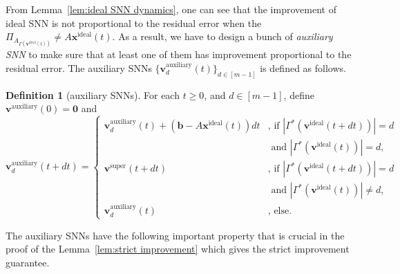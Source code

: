 \documentclass[11pt]{article}
\theoremstyle{remark}
\theoremstyle{definition}
\newtheorem{definition}{Definition}
\newcommand{\bx}{\mathbf{x}}
\newcommand{\bb}{\mathbf{b}}
\newcommand{\bv}{\mathbf{v}}
\begin{document}
From Lemma~\ref{lem:ideal SNN dynamics}, one can see that the improvement of ideal SNN is not proportional to the residual error when the $\Pi_{A_{\Gamma(\bv^\text{ideal}(t))}}\neq A\bx^\text{ideal}(t)$. As a result, we have to design a bunch of \textit{auxiliary SNN} to make sure that at least one of them has improvement proportional to the residual error. The auxiliary SNNs $\{\bv^\text{auxiliary}_d(t)\}_{d\in[m-1]}$ is defined as follows.
\begin{definition}[auxiliary SNNs]\label{def:auxiliary}
	For each $t\geq0$, and $d\in[m-1]$, define $\bv^\text{auxiliary}(0)=\mathbf{0}$ and
	\[
	\bv^\text{auxiliary}_d(t+dt) = \left\{
	\begin{array}{ll}
	\bv^\text{auxiliary}_d(t)+\left(\bb-A\bx^\text{ideal}(t)\right)dt&\text{, if }|\Gamma^*(\bv^\text{ideal}(t+dt))|=d\\&\text{ and } |\Gamma^*(\bv^\text{ideal}(t))|=d,\\
	\bv^\text{super}(t+dt)&\text{, if }|\Gamma^*(\bv^\text{ideal}(t+dt))|=d\\&\text{ and }|\Gamma^*(\bv^\text{ideal}(t))|\neq d,\\
	\bv_d^\text{auxiliary}(t)&\text{, else}.
	\end{array}
	\right.
	\]
\end{definition}

The auxiliary SNNs have the following important property that is crucial in the proof of the Lemma~\ref{lem:strict improvement} which gives the strict improvement guarantee.
\end{document}
